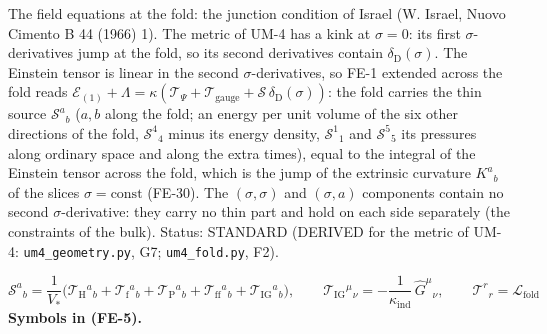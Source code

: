 \documentclass[
  10pt,
]{article}
\begin{document}
The field equations at the fold: the junction condition of Israel (W.
Israel, Nuovo Cimento B 44 (1966) 1). The metric of UM-4 has a kink at
\(\sigma = 0\): its first \(\sigma\)-derivatives jump at the fold, so
its second derivatives contain \(\delta_{\mathrm{D}}(\sigma)\). The
Einstein tensor is linear in the second \(\sigma\)-derivatives, so FE-1
extended across the fold reads
\(\mathcal{E}_{(1)} + \Lambda = \kappa(\mathcal{T}_\Psi + \mathcal{T}_{\mathrm{gauge}} + \mathcal{S}\,\delta_{\mathrm{D}}(\sigma))\):
the fold carries the thin source \(\mathcal{S}^a{}_b\) (\(a, b\) along
the fold; an energy per unit volume of the six other directions of the
fold, \(\mathcal{S}^4{}_4\) minus its energy density,
\(\mathcal{S}^1{}_1\) and \(\mathcal{S}^5{}_5\) its pressures along
ordinary space and along the extra times), equal to the integral of the
Einstein tensor across the fold, which is the jump of the extrinsic
curvature \(K^a{}_b\) of the slices \(\sigma = \text{const}\) (FE-30).
The \((\sigma, \sigma)\) and \((\sigma, a)\) components contain no
second \(\sigma\)-derivative: they carry no thin part and hold on each
side separately (the constraints of the bulk). Status: STANDARD (DERIVED
for the metric of UM-4: \texttt{um4\_geometry.py}, G7;
\texttt{um4\_fold.py}, F2).

\[
\mathcal{S}^a{}_b = \frac{1}{V_*}\Big(\mathcal{T}_{\mathrm{H}}{}^a{}_b + \mathcal{T}_{\mathrm{f}}{}^a{}_b
 + \mathcal{T}_{\mathrm{P}}{}^a{}_b + \mathcal{T}_{\mathrm{ff}}{}^a{}_b + \mathcal{T}_{\mathrm{IG}}{}^a{}_b\Big),\qquad
\mathcal{T}_{\mathrm{IG}}{}^\mu{}_\nu = -\frac{1}{\kappa_{\mathrm{ind}}}\,\hat G^\mu{}_\nu,\qquad
\mathcal{T}^r{}_r = \mathcal{L}_{\mathrm{fold}} \tag{FE-5}
\] \textbf{Symbols in (FE-5).}
\end{document}

